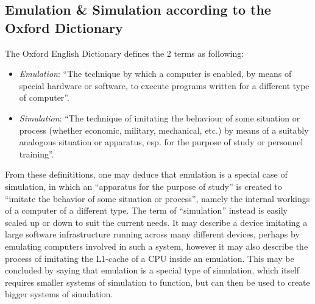 \subsection{Emulation \& Simulation according to the Oxford Dictionary}
The Oxford English Dictionary defines the 2 terms as following:
\begin{itemize}
    \item \emph{Emulation}: \enquote{The technique by which a
    computer is enabled, by means of special
    hardware or software, to execute programs
    written for a different type of computer}\cite[p. 196]{emulation_oxford}.
    \item \emph{Simulation}: \enquote{The technique of imitating the behaviour of
    some situation or process (whether economic,
    military, mechanical, etc.) by means of a
    suitably analogous situation or apparatus, esp.
    for the purpose of study or personnel training}\cite[p.503]{simulation_oxford}.
\end{itemize}
From these definititions, one may deduce that emulation is a special case of simulation,
in which an \enquote{apparatus for the purpose of study} is created to \enquote{imitate the behavior of some situation or process},
namely the internal workings of a computer of a different type.\linebreak
The term of \enquote{simulation} instead is easily scaled up or down to suit the current needs.
It may describe a device imitating a large software infrastructure running across many different devices,
perhaps by emulating computers involved in such a system,
however it may also describe the process of imitating the L1-cache of a CPU inside an emulation.\linebreak
This may be concluded by saying that emulation is a special type of simulation,
which itself requires smaller systems of simulation to function,
but can then be used to create bigger systems of simulation.

